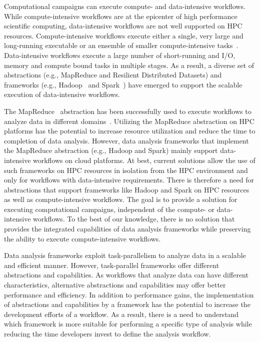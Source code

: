 Computational campaigns can execute compute- and data-intensive workflows. While
compute-intensive workflows are at the epicenter of high performance scientific
computing, data-intensive workflows are not well supported on HPC resources.
Compute-intensive workflows execute either a single, very large and long-running
executable or an ensemble of smaller compute-intensive
tasks~\cite{balasubramanian2018harnessing}. Data-intensive workflows execute a
large number of short-running and I/O, memory and compute bound tasks in
multiple stages. As a result, a diverse set of abstractions (e.g., MapReduce and
Resilient Distributed Datasets) and frameworks (e.g., Hadoop~\cite{hadoop} and
Spark~\cite{zaharia2010spark}) have emerged to support the scalable execution of
data-intensive workflows.

The MapReduce~\cite{dean2004mapreduce} abstraction has been successfully used to
execute workflows to analyze data in different
domains~\cite{hellerstein2012science}. Utilizing the MapReduce abstraction on
HPC platforms has the potential to increase resource utilization and reduce the
time to completion of data analysis. However, data analysis frameworks that
implement the MapReduce abstraction (e.g., Hadoop and Spark) mainly support
data-intensive workflows on cloud platforms. At best, current solutions allow
the use of such frameworks on HPC resources in isolation from the HPC
environment and only for workflows with data-intensive requirements. There is
therefore a need for abstractions that support frameworks like Hadoop and Spark
on HPC resources as well as compute-intensive workflows. The goal is to provide
a solution for executing computational campaigns, independent of the compute- or
data-intensive workflows. To the best of our knowledge, there is no solution
that provides the integrated capabilities of data analysis frameworks while
preserving the ability to execute compute-intensive workflows.

Data analysis frameworks exploit task-parallelism to analyze data in a scalable
and efficient manner. However, task-parallel frameworks offer different
abstractions and capabilities. As workflows that analyze data can have different
characteristics, alternative abstractions and capabilities may offer better
performance and efficiency. In addition to performance gains, the implementation
of abstractions and capabilities by a framework has the potential to increase
the development efforts of a workflow. As a result, there is a need to
understand which framework is more suitable for performing a specific type of
analysis while reducing the time developers invest to define the analysis
workflow.


